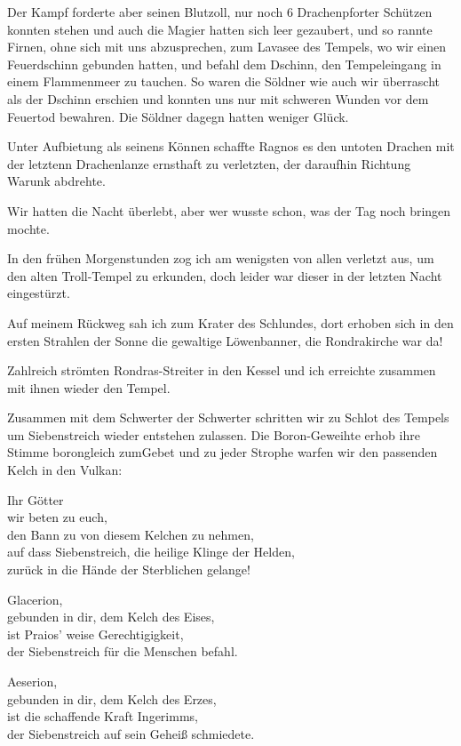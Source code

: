Der Kampf forderte aber seinen Blutzoll, nur noch 6 Drachenpforter Schützen konnten stehen und auch die Magier hatten sich leer gezaubert, und so rannte Firnen, ohne sich mit uns abzusprechen, zum Lavasee des Tempels, wo wir einen Feuerdschinn gebunden hatten, und befahl dem Dschinn, den Tempeleingang in einem Flammenmeer zu tauchen. So waren die Söldner wie auch wir überrascht als der Dschinn erschien und konnten uns nur mit schweren Wunden vor dem Feuertod bewahren. Die Söldner dagegn hatten weniger Glück.

Unter Aufbietung als seinens Können schaffte Ragnos es den untoten Drachen mit der letztenn Drachenlanze ernsthaft zu verletzten, der daraufhin Richtung Warunk abdrehte.

Wir hatten die Nacht überlebt, aber wer wusste schon, was der Tag noch bringen mochte.

In den frühen Morgenstunden zog ich am wenigsten von allen verletzt aus, um den alten Troll-Tempel zu erkunden, doch leider war dieser in der letzten Nacht eingestürzt.

Auf meinem Rückweg sah ich zum Krater des Schlundes, dort erhoben sich in den ersten Strahlen der Sonne die gewaltige Löwenbanner, die Rondrakirche war da!

Zahlreich strömten Rondras-Streiter in den Kessel und ich erreichte zusammen mit ihnen wieder den Tempel.

Zusammen mit dem Schwerter der Schwerter schritten wir zu Schlot des Tempels um Siebenstreich wieder entstehen zulassen.
Die Boron-Geweihte erhob ihre Stimme borongleich zumGebet und zu jeder Strophe warfen wir den passenden Kelch in den Vulkan:

Ihr Götter\\
wir beten zu euch,\\
den Bann zu von diesem Kelchen zu nehmen,\\
auf dass Siebenstreich, die heilige Klinge der Helden,\\
zurück in die Hände der Sterblichen gelange!

Glacerion,\\
gebunden in dir, dem Kelch des Eises,\\
ist Praios' weise Gerechtigigkeit,\\
der Siebenstreich für die Menschen befahl.

Aeserion,\\
gebunden in dir, dem Kelch des Erzes,\\
ist die schaffende Kraft Ingerimms,\\
der Siebenstreich auf sein Geheiß schmiedete.

